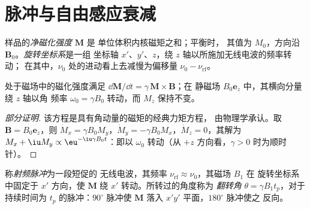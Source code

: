 \section{脉冲与自由感应衰减}

\begin{definition}\label{def:b3:advanced-nmr:magnetisation}
样品的\emph{净磁化强度} $\mathbf M$ 是
单位体积内核磁矩之和；平衡时，
其值为 $M_0$，方向沿 $\mathbf B_0$。\emph{旋转坐标系}是一组
坐标轴 $x'$、$y'$、$z$，绕 $z$ 轴以所施加无线电波的频率转动；
在其中，$\nu_0$ 处的进动看上去减慢为偏移量 $\nu_0 -
\nu_{\mathrm{rf}}$。
\end{definition}

\begin{proposition}[进动]\label{prop:b3:advanced-nmr:precession}
处于磁场中的磁化强度满足 $\dd\mathbf M/\dd t = \gamma\,\mathbf M\times\mathbf B$；在
静磁场 $B_0\mathbf e_z$ 中，其横向分量绕 $z$ 轴以角
频率 $\omega_0 = \gamma B_0$ 转动，而 $M_z$ 保持不变。
\end{proposition}

\begin{proof}[部分证明]
该方程是具有角动量的磁矩的经典力矩方程，
由物理学承认。取 $\mathbf B = B_0\mathbf e_z$，则 $\dot M_x = \gamma
B_0M_y$，$\dot M_y = -\gamma B_0M_x$，$\dot M_z = 0$，其解为 $M_x + \iu M_y \propto
\eu^{-\iu\gamma B_0t}$：即以 $\omega_0$ 转动（从 $+z$ 方向看，$\gamma > 0$ 时为顺时针）。
\end{proof}

\begin{definition}\label{def:b3:advanced-nmr:pulse}
称\emph{射频脉冲}为一段短促的
无线电波，其频率 $\nu_{\mathrm{rf}} \approx \nu_0$，其磁场 $B_1$ 在
旋转坐标系中固定于 $x'$ 方向，使 $\mathbf M$ 绕 $x'$ 转动。所转过的角度称为
\emph{翻转角} $\theta = \gamma B_1t_p$，对于持续时间为
$t_p$ 的脉冲：$90^\circ$ 脉冲使 $\mathbf M$ 落入 $x'y'$ 平面，$180^\circ$ 脉冲使之
反向。
\end{definition}

